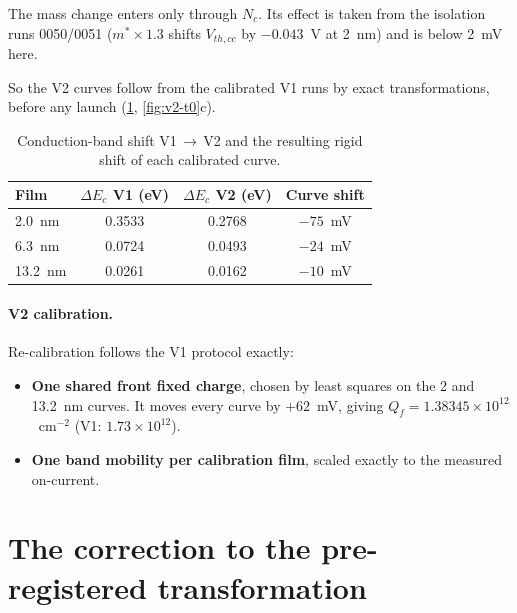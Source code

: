 The mass change enters only through $N_c$. Its effect is taken from the isolation runs 0050/0051 ($m^*\times1.3$
shifts $V_{th,cc}$ by $-0.043$~V at 2~nm) and is below 2~mV here.

So the V2 curves follow from the calibrated V1 runs by exact transformations, before any launch
(\cref{tab:v2-shift}, \cref{fig:v2-t0}c).

\begin{table}[htbp]\centering\small
\caption{Conduction-band shift V1\,$\to$\,V2 and the resulting rigid shift of each calibrated curve.}\label{tab:v2-shift}
\begin{tabular}{lccc}\toprule
Film & $\Delta E_c$ V1 (eV) & $\Delta E_c$ V2 (eV) & Curve shift\\\midrule
2.0~nm & 0.3533 & 0.2768 & $-75$~mV\\
6.3~nm & 0.0724 & 0.0493 & $-24$~mV\\
13.2~nm & 0.0261 & 0.0162 & $-10$~mV\\\bottomrule
\end{tabular}
\end{table}

\paragraph{V2 calibration.} Re-calibration follows the V1 protocol exactly:
\begin{itemize}
\item \textbf{One shared front fixed charge}, chosen by least squares on the 2 and 13.2~nm curves. It moves every curve
by $+62$~mV, giving $Q_f = 1.38345\times10^{12}$~cm$^{-2}$ (V1: $1.73\times10^{12}$).
\item \textbf{One band mobility per calibration film}, scaled exactly to the measured on-current.
\end{itemize}

\section{The correction to the pre-registered transformation}
\label{sec:v2-correction}

